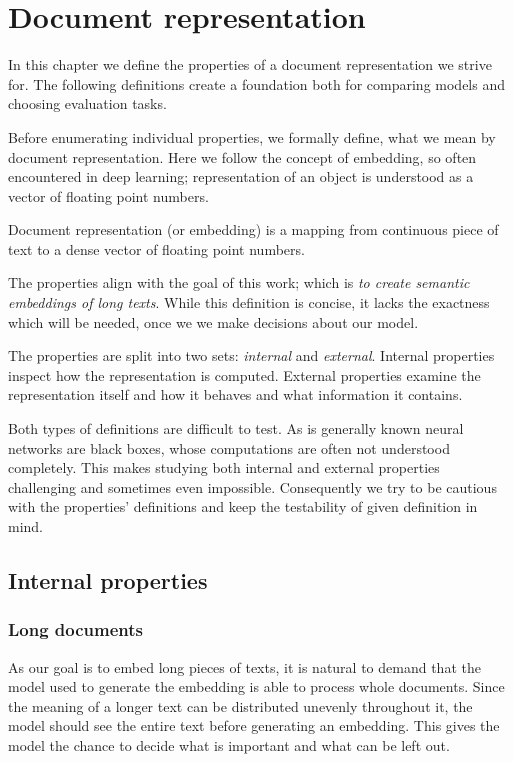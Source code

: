 \chapter{Document representation}

In this chapter we define the properties of a document representation we strive
for. The following definitions create a foundation both for comparing models
and choosing evaluation tasks.

Before enumerating individual properties, we formally define, what we mean by
document representation. Here we follow the concept of embedding, so often
encountered in deep learning; representation of an object is understood as a
vector of floating point numbers.

\begin{defn}
  Document representation (or embedding) is a mapping from continuous
  piece of text to a dense vector of floating point numbers.
\end{defn}

The properties align with the goal of this work; which is \emph{to create
semantic embeddings of long texts}. While this definition is concise, it lacks
the exactness which will be needed, once we we make decisions about our model.

The properties are split into two sets: \emph{internal} and \emph{external}.
Internal properties inspect how the representation is computed. External
properties examine the representation itself and how it behaves and what
information it contains.

Both types of definitions are difficult to test. As is generally known neural
networks are black boxes, whose computations are often not understood
completely. This makes studying both internal and external properties
challenging and sometimes even impossible. Consequently we try to be cautious
with the properties' definitions and keep the testability of given definition
in mind.


\section{Internal properties}



\subsection{Long documents}

As our goal is to embed long pieces of texts, it is natural to demand that the
model used to generate the embedding is able to process whole documents. Since
the meaning of a longer text can be distributed unevenly throughout it, the
model should see the entire text before generating an embedding. This gives the
model the chance to decide what is important and what can be left out.



